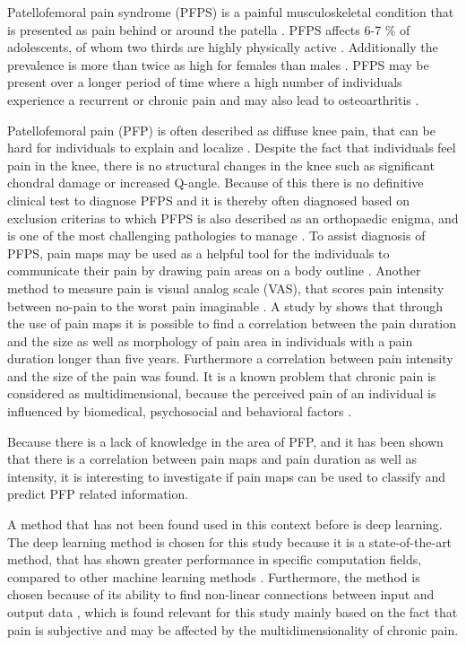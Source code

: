 Patellofemoral pain syndrome (PFPS) is a painful musculoskeletal condition that is presented as pain behind or around the patella \citep{Maclachlan2017, Smith2015}. PFPS affects 6-7 \% of adolescents, of whom two thirds are highly physically active \citep{Rathleff2015}. Additionally the prevalence is more than twice as high for females than males \citep{Rathleff2015, Petersen2013}.
PFPS may be present over a longer period of time where a high number of individuals experience a recurrent or chronic pain \citep{Witvrouw2014} and may also lead to osteoarthritis \citep{Petersen2013, Crossley2016}.

\noindent
Patellofemoral pain (PFP) is often described as diffuse knee pain, that can be hard for individuals to explain and localize \citep{Witvrouw2014}. Despite the fact that individuals feel pain in the knee, there is no structural changes in the knee such as significant chondral damage or increased Q-angle. Because of this there is no definitive clinical test to diagnose PFPS and it is thereby often diagnosed based on exclusion criterias \citep{Petersen2013} to which PFPS is also described as an orthopaedic enigma, and is one of the most challenging pathologies to manage \citep{Dye2001}. 
To assist diagnosis of PFPS, pain maps may be used as a helpful tool for the individuals to communicate their pain by drawing pain areas on a body outline \citep{Boudreau2016}. \newline
Another method to measure pain is visual analog scale (VAS), that scores pain intensity between no-pain to the worst pain imaginable \citep{Haefeli2005}.
A study by \citeauthor{Boudreau2017} shows that through the use of pain maps it is possible to find a correlation between the pain duration and the size as well as morphology of pain area in individuals with a pain duration longer than five years. Furthermore a correlation between pain intensity and the size of the pain was found.\citep{Boudreau2017}
It is a known problem that chronic pain is considered as multidimensional, because the perceived pain of an individual is influenced by biomedical, psychosocial and behavioral factors \citep{Dansie2013}.

\noindent
Because there is a lack of knowledge in the area of PFP, and it has been shown that there is a correlation between pain maps and pain duration as well as intensity, it is interesting to investigate if pain maps can be used to classify and predict PFP related information. 

\noindent
A method that has not been found used in this context before is deep learning. The deep learning method is chosen for this study because it is a state-of-the-art method, that has shown greater performance in specific computation fields, compared to other machine learning methods \citep{LeCun2015}.
Furthermore, the method is chosen because of its ability to find non-linear connections between input and output data \citep{LeCun2015}, which is found relevant for this study mainly based on the fact that pain is subjective and may be affected by the multidimensionality of chronic pain.  \\


